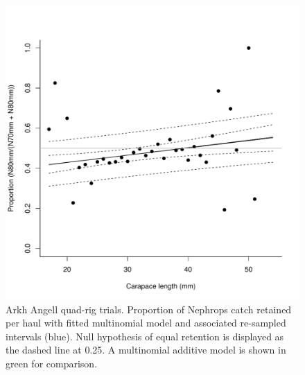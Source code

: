 \documentclass[12pt]{article}\usepackage[]{graphicx}\usepackage[]{color}
\makeatletter
\def\maxwidth{ %
  \ifdim\Gin@nat@width>\linewidth
    \linewidth
  \else
    \Gin@nat@width
  \fi
}
\newenvironment{knitrout}{}{} %
\makeatother
\begin{document}
\begin{knitrout}
\begin{figure}
\includegraphics[width=\maxwidth]{figure/unnamed-chunk-7-1} \caption[Arkh Angell quad-rig trials]{Arkh Angell quad-rig trials. Proportion of Nephrops catch retained per haul with fitted multinomial model and associated re-sampled intervals (blue). Null hypothesis of equal retention is displayed as the dashed line at 0.25. A multinomial additive model is shown in green for comparison.}\label{fig:unnamed-chunk-7}
\end{figure}


\end{knitrout}



\end{document}
